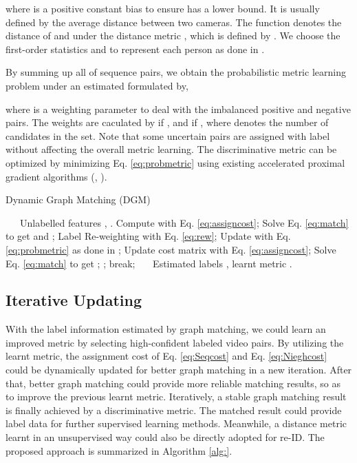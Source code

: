\documentclass[10pt,twocolumn,letterpaper]{article}
\begin{document}
where  is a positive constant bias to ensure  has a lower bound. It is usually defined by the average distance between two cameras. The function  denotes the distance of  and  under the distance metric , which is defined by . We choose the first-order statistics  and  to represent each person as done in \cite{ijcai16video,cvpr16top}.

By summing up all of sequence pairs, we obtain the probabilistic metric learning problem under an estimated  formulated by,

where  is a weighting parameter to deal with the imbalanced positive and negative pairs. The weights  are caculated by  if , and  if , where  denotes the number of candidates in the set. Note that some uncertain pairs are assigned with label  without affecting the overall metric learning. The discriminative metric can be optimized by minimizing Eq. \ref{eq:probmetric} using existing accelerated proximal gradient algorithms (\eg, \cite{apg09,iccv15liao,wang17Statistical}).


\begin{algorithm}[t]
\caption{Dynamic Graph Matching (DGM)}
\label{alg:}
\begin{algorithmic}[1]
    \renewcommand{\algorithmicrequire}{\textbf{Input:}}
    \renewcommand\algorithmicensure {\textbf{Output:}}
    \REQUIRE ~~\ Unlabelled features , .
    \STATE Compute  with Eq. \ref{eq:assigncost};
    \STATE Solve Eq. \ref{eq:match} to get  and ;
    \STATE Label Re-weighting  with Eq. \ref{eq:rew};
    \STATE Update  with Eq. \ref{eq:probmetric} as done in \cite{iccv15liao};
    \STATE Update cost matrix  with Eq. \ref{eq:assigncost};
    \STATE Solve Eq. \ref{eq:match} to get ;
    \IF {}
    \STATE  ;
    \ENDIF
    \STATE  break;
    \ENDIF
    \ENDFOR
    \ENSURE ~~\ Estimated labels , learnt metric  .
\end{algorithmic}
\end{algorithm}
\subsection{Iterative Updating}\label{sec:iter}
 With the label information estimated by graph matching, we could learn an improved metric by selecting high-confident labeled video pairs. By utilizing the learnt metric, the assignment cost of Eq. \ref{eq:Seqcost} and Eq. \ref{eq:Nieghcost} could be dynamically updated for better graph matching in a new iteration. After that, better graph matching could provide more reliable matching results, so as to improve the previous learnt metric. Iteratively, a stable graph matching result is finally achieved by a discriminative metric. The matched result could provide label data for further supervised learning methods. Meanwhile, a distance metric learnt in an unsupervised way could also be directly adopted for re-ID. The proposed approach is summarized in Algorithm \ref{alg:}.
\end{document}
